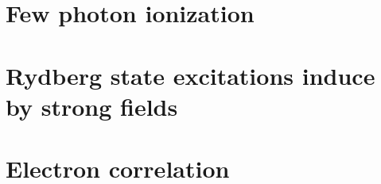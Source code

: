 \section{Few photon ionization} %
\label{sec:few_photon_ionization}


\section{Rydberg state excitations induce by strong fields} %
\label{sec:rydberg_state_excitations_induce_by_strong_fields}


\section{Electron correlation} %
\label{sec:electron_correlation}



